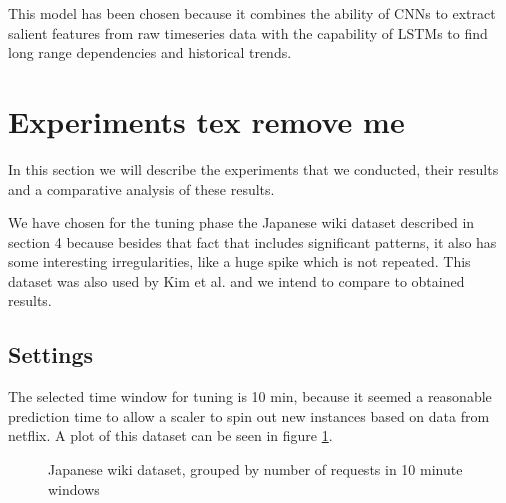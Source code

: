 \documentclass[12pt]{article}
\begin{document}
This model has been chosen because it combines the ability of CNNs to extract salient features from raw timeseries data with the capability of LSTMs to find long range dependencies and historical trends.

\section{Experiments tex remove me}
In this section we will describe the experiments that we conducted, their results and a comparative analysis of these results.

We have chosen for the tuning phase the Japanese wiki dataset described in section 4 because besides that fact that includes significant patterns, it also has some interesting irregularities, like a huge spike which is not repeated. This dataset was also used by Kim et al.\cite{CloudInsight} and we intend to compare to obtained results.

\subsection{Settings}
The selected time window for tuning is 10 min, because it seemed a reasonable prediction time to allow a scaler to spin out new instances based on data from netflix\cite{scryer}. A plot of this dataset can be seen in figure \ref{fig:jp10}.

\begin{figure}
	\caption{Japanese wiki dataset, grouped by number of requests in 10 minute windows}
	\label{fig:jp10}
\end{figure}
\end{document}
